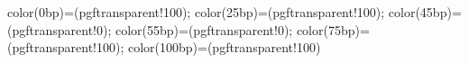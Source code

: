 \newdimen\ys@frame@linewidth
\newdimen\ys@frame@radius
\newdimen\ys@frame@sep
\def\ys@frame@fill@opacity{0.2}

{color(0bp)=(pgftransparent!100); color(25bp)=(pgftransparent!100);
color(45bp)=(pgftransparent!0); color(55bp)=(pgftransparent!0);
color(75bp)=(pgftransparent!100); color(100bp)=(pgftransparent!100)}

\def\ys@frame@star@list@t{%
  -0.7071\ys@frame@radius+0.2133\ys@frame@sep/%
    -0.7071\ys@frame@radius+0.2133\ys@frame@sep/%
    frame.north east,%
  0.7071\ys@frame@radius-0.2133\ys@frame@sep/%
    -0.7071\ys@frame@radius+0.2133\ys@frame@sep/%
    frame.north west}
\def\ys@frame@star@list@b{%
  0.7071\ys@frame@radius-0.2133\ys@frame@sep/%
    0.7071\ys@frame@radius-0.2133\ys@frame@sep/%
    frame.south west,%
  -0.7071\ys@frame@radius+0.2133\ys@frame@sep/%
    0.7071\ys@frame@radius-0.2133\ys@frame@sep/%
    frame.south east}
\edef\ys@frame@star@list{\ys@frame@star@list@t,\ys@frame@star@list@b}

